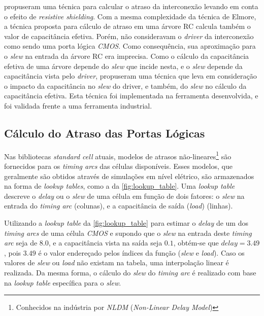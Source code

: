 \documentclass[
	12pt,				%
	openright,			%
	twoside,			%
	a4paper,			%
	english,			%
	french,				%
	spanish,			%
	brazil,				%
	]{abntex2}
\begin{document}
 propuseram uma técnica para calcular o atraso da interconexão levando em conta o efeito de \textit{resistive shielding}. Com a mesma complexidade da técnica de Elmore, a técnica proposta para cálculo de atraso em uma árvore RC calcula também o valor de capacitância efetiva. Porém,  não consideravam o \textit{driver} da interconexão como sendo uma porta lógica \textit{CMOS}. Como consequência, sua aproximação para o \textit{slew} na entrada da árvore RC era imprecisa. Como o cálculo da capacitância efetiva de uma árvore depende do \textit{slew} que incide nesta, e o \textit{slew} depende da capacitância vista pelo \textit{driver},  propuseram uma técnica que leva em consideração o impacto da capacitância no \textit{slew} do driver, e também, do \textit{slew} no cálculo da capacitância efetiva. Esta técnica foi implementada na ferramenta desenvolvida, e foi validada frente a uma ferramenta industrial.

\subsection{Cálculo do Atraso das Portas Lógicas}
Nas bibliotecas \textit{standard cell} atuais, modelos de atrasos não-lineares\footnote{Conhecidos na indústria por \textit{NLDM} (\textit{Non-Linear Delay Model})} são fornecidos para os \textit{timing arcs} das células disponíveis. Esses modelos, que geralmente são obtidos através de simulações em nível elétrico, são armazenados na forma de \textit{lookup tables}, como a da \autoref{fig:lookup_table}. Uma \textit{lookup table} descreve o \textit{delay} ou o \textit{slew} de uma célula em função de dois fatores: o \textit{slew} na entrada do \textit{timing arc} (colunas), e a capacitância de saída (\textit{load}) (linhas).

Utilizando a \textit{lookup table} da \autoref{fig:lookup_table} para estimar o \textit{delay} de um dos \textit{timing arcs} de uma célula \textit{CMOS} e supondo que o \textit{slew} na entrada deste \textit{timing arc} seja de $8.0$, e a capacitância vista na saída seja $0.1$, obtém-se que $delay = 3.49$, pois $3.49$ é o valor endereçado pelos índices da função (\textit{slew} e \textit{load}). Caso os valores de \textit{slew} ou \textit{load} não existam na tabela, uma interpolação linear é realizada. Da mesma forma, o cálculo do \textit{slew} do \textit{timing arc} é realizado com base na \textit{lookup table} específica para o \textit{slew}.
\end{document}
